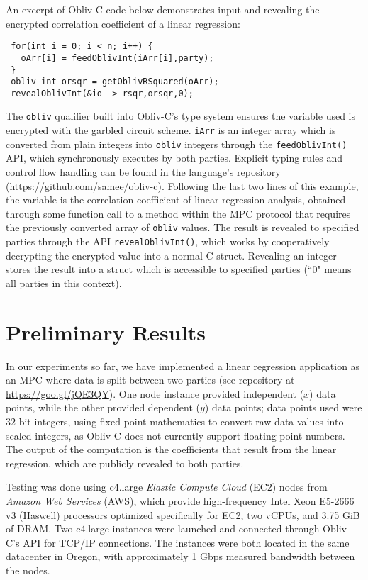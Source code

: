 \documentclass[conference]{IEEEtran}
\begin{document}
An excerpt of Obliv-C code below demonstrates input and revealing the 
encrypted correlation coefficient of a linear regression:
\begin{verbatim}
 for(int i = 0; i < n; i++) {
   oArr[i] = feedOblivInt(iArr[i],party);
 }
 obliv int orsqr = getOblivRSquared(oArr);
 revealOblivInt(&io -> rsqr,orsqr,0);
\end{verbatim}
\noindent
The {\tt obliv} qualifier built into Obliv-C’s type system ensures
the variable used is encrypted with the garbled circuit 
scheme\cite{cryptoeprint:2015:1153}. {\tt iArr} is an integer array which is 
converted from plain integers into {\tt obliv}
integers through the {\tt feedOblivInt()} API, which synchronously executes 
by both parties. Explicit typing rules and control flow handling can be found in
the language's repository (\url{https://github.com/samee/obliv-c}).
Following the last two lines of this example, the variable is the
correlation coefficient of linear regression analysis, obtained through
some function call to a method within the MPC protocol that requires the
previously converted array of {\tt obliv} values. The result is
revealed to specified parties through the API {\tt revealOblivInt()},
which works by cooperatively decrypting the encrypted value into a
normal C struct.  Revealing an integer stores the result into a struct
which is accessible to specified parties (``0" means all parties in this
context).

\section{Preliminary Results}

In our experiments so far, we have implemented a linear regression
application as an MPC where data is split between two parties (see repository
at \url{https://goo.gl/jQE3QY}).  One node
instance provided independent ($x$) data points, while the other
provided dependent ($y$) data points; data points used were 32-bit
integers, using fixed-point mathematics to convert raw data values into
scaled integers, as Obliv-C does not currently support floating point
numbers.  The output of the computation is the coefficients that result
from the linear regression, which are publicly revealed to both parties.

Testing was done using c4.large \emph{Elastic Compute Cloud} (EC2) nodes
from \emph{Amazon Web Services} (AWS)\cite{aws:ec2}, which provide
high-frequency Intel Xeon E5-2666 v3 (Haswell) processors optimized
specifically for EC2, two vCPUs, and 3.75 GiB of DRAM.  Two c4.large
instances were launched and connected through Obliv-C's API for TCP/IP
connections. The instances were both located in the same datacenter in
Oregon, with approximately 1 Gbps measured bandwidth between the
nodes. 
\end{document}
